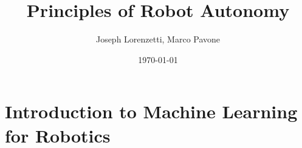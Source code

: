\documentclass[nohyper,nobib]{tufte-book}
\title{Principles of Robot Autonomy}
\author{Joseph Lorenzetti, Marco Pavone}
\date{\today}
\begin{document}
\appendix
\chapter{Introduction to Machine Learning for Robotics}


\printbibliography
\end{document}
